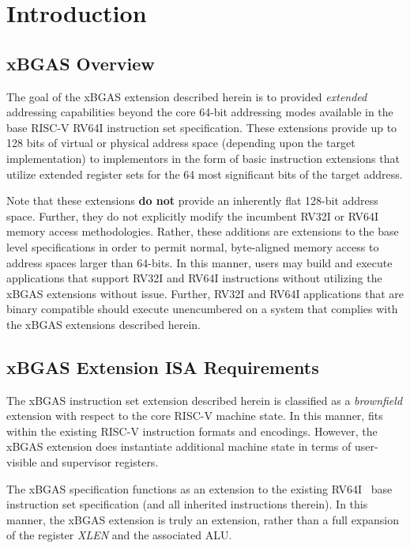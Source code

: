 \documentclass{article}
\begin{document}
\section{Introduction}

\subsection{xBGAS Overview}

The goal of the \gls{xBGAS} extension described herein is to provided \textit{extended} 
addressing capabilities beyond the core 64-bit addressing modes available in the 
base RISC-V RV64I instruction set specification.  These extensions provide up 
to 128 bits of virtual or physical address space (depending upon the target implementation) 
to implementors in the form of basic instruction extensions that utilize extended 
register sets for the 64 most significant bits of the target address.  

Note that these extensions \textbf{do not} provide an inherently flat 128-bit address space.  
Further, they do not explicitly modify the incumbent RV32I or RV64I memory access 
methodologies.  Rather, these additions are extensions to the base level specifications in order to 
permit normal, byte-aligned memory access to address spaces larger than 64-bits.  In 
this manner, users may build and execute applications that support RV32I and RV64I 
instructions without utilizing the xBGAS extensions without issue.  Further, RV32I and RV64I 
applications that are binary compatible should execute unencumbered on a system that 
complies with the xBGAS extensions described herein.

\subsection{xBGAS Extension ISA Requirements}

The xBGAS instruction set extension described herein is classified 
as a \textit{brownfield} extension with respect to the core RISC-V 
machine state.  In this manner, fits within the existing RISC-V instruction 
formats and encodings.  However, the xBGAS extension does instantiate 
additional machine state in terms of user-visible and supervisor registers.

The xBGAS specification functions as an extension to the existing RV64I~\cite{RVSpec} 
base instruction set specification (and all inherited instructions therein).  In this 
manner, the xBGAS extension is truly an extension, rather than a full expansion 
of the register \textit{XLEN} and the associated ALU.
\end{document}
